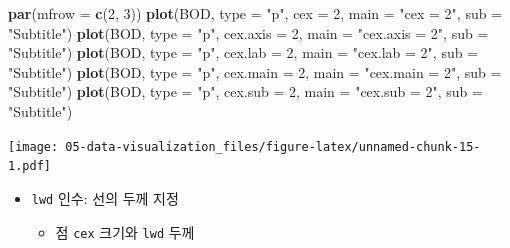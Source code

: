 \documentclass[
  11pt,
]{krantz}
\newenvironment{Shaded}{\begin{snugshade}}{\end{snugshade}}
\newcommand{\DataTypeTok}[1]{\textcolor[rgb]{0.27,0.27,0.27}{#1}}
\newcommand{\DecValTok}[1]{\textcolor[rgb]{0.06,0.06,0.06}{#1}}
\newcommand{\KeywordTok}[1]{\textcolor[rgb]{0.27,0.27,0.27}{\textbf{#1}}}
\newcommand{\NormalTok}[1]{#1}
\newcommand{\StringTok}[1]{\textcolor[rgb]{0.5,0.5,0.5}{#1}}
\providecommand{\tightlist}{%
  \setlength{\itemsep}{0pt}\setlength{\parskip}{0pt}}
\begin{document}
\footnotesize

\begin{Shaded}
\begin{Highlighting}[]
\KeywordTok{par}\NormalTok{(}\DataTypeTok{mfrow =} \KeywordTok{c}\NormalTok{(}\DecValTok{2}\NormalTok{, }\DecValTok{3}\NormalTok{))}
\KeywordTok{plot}\NormalTok{(BOD, }\DataTypeTok{type =} \StringTok{"p"}\NormalTok{, }\DataTypeTok{cex =} \DecValTok{2}\NormalTok{, }
     \DataTypeTok{main =} \StringTok{"cex = 2"}\NormalTok{, }
     \DataTypeTok{sub =} \StringTok{"Subtitle"}\NormalTok{)}
\KeywordTok{plot}\NormalTok{(BOD, }\DataTypeTok{type =} \StringTok{"p"}\NormalTok{, }
     \DataTypeTok{cex.axis =} \DecValTok{2}\NormalTok{, }
     \DataTypeTok{main =} \StringTok{"cex.axis = 2"}\NormalTok{, }
     \DataTypeTok{sub =} \StringTok{"Subtitle"}\NormalTok{)}
\KeywordTok{plot}\NormalTok{(BOD, }\DataTypeTok{type =} \StringTok{"p"}\NormalTok{, }
     \DataTypeTok{cex.lab =} \DecValTok{2}\NormalTok{, }
     \DataTypeTok{main =} \StringTok{"cex.lab = 2"}\NormalTok{, }
     \DataTypeTok{sub =} \StringTok{"Subtitle"}\NormalTok{)}
\KeywordTok{plot}\NormalTok{(BOD, }\DataTypeTok{type =} \StringTok{"p"}\NormalTok{, }
     \DataTypeTok{cex.main =} \DecValTok{2}\NormalTok{, }
     \DataTypeTok{main =} \StringTok{"cex.main = 2"}\NormalTok{, }
     \DataTypeTok{sub =} \StringTok{"Subtitle"}\NormalTok{)}
\KeywordTok{plot}\NormalTok{(BOD, }\DataTypeTok{type =} \StringTok{"p"}\NormalTok{,}
     \DataTypeTok{cex.sub =} \DecValTok{2}\NormalTok{, }
     \DataTypeTok{main =} \StringTok{"cex.sub = 2"}\NormalTok{, }
     \DataTypeTok{sub =} \StringTok{"Subtitle"}\NormalTok{)}
\end{Highlighting}
\end{Shaded}

\texttt{[image: 05-data-visualization\_files/figure-latex/unnamed-chunk-15-1.pdf]}

\normalsize

\begin{itemize}
\tightlist
\item
  \texttt{lwd} 인수: 선의 두께 지정

  \begin{itemize}
  \tightlist
  \item
    점 \texttt{cex} 크기와 \texttt{lwd} 두께
  \end{itemize}
\end{itemize}

\footnotesize
\end{document}
